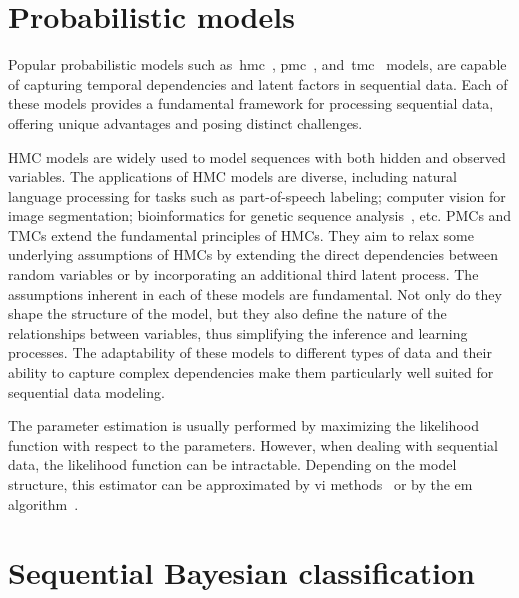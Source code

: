 \section*{Probabilistic models}
Popular probabilistic models such as~\gls*{hmc}~\citep{rabiner1989tutorial}, 
\gls*{pmc}~\citep{pieczynski2003pairwise, derrode2004signal}, 
and~\gls*{tmc}~\citep{wp-cras-chaines3,pieczynski2005triplet}
models, are capable of capturing temporal dependencies and latent factors in
sequential data. Each of these models provides a fundamental framework for
processing sequential data, offering unique advantages and posing distinct
challenges.

HMC models are widely used to model sequences with both hidden and observed variables. 
The applications of HMC models are diverse, 
including natural language processing
for tasks such as part-of-speech labeling; computer vision for image
segmentation;  bioinformatics for genetic sequence 
analysis~\citep{rabiner1989tutorial, gales2008application, 
yoon2009hidden, li2021new, kupiec1992robust, paul2015hidden}, etc. 
PMCs and TMCs extend the fundamental principles of HMCs. They aim to
relax some underlying assumptions of HMCs by extending the direct
dependencies between random variables or by incorporating an additional third
latent process. The assumptions inherent in each of these models are fundamental.
Not only do they shape the structure of the model, but they also define the
nature of the relationships between variables, thus simplifying the inference
and learning processes. The adaptability of these models to different types of
data and their ability to capture complex dependencies make them particularly
well suited for sequential data modeling.

The parameter estimation is usually
performed by maximizing the likelihood function with respect to the parameters. 
However, when dealing with sequential data, the likelihood function can be intractable.
Depending on the model structure, this estimator can be approximated by 
\gls*{vi} methods~\citep{jaakkola2000bayesian,Blei_2017} or by the
\gls*{em} algorithm~\citep{dempster1977maximum}.


\vspace{.30cm}
\section*{Sequential Bayesian classification}

